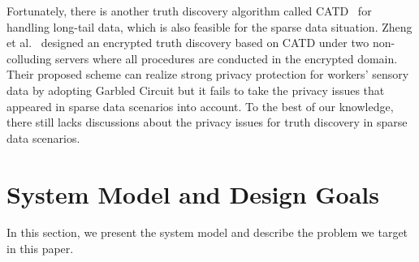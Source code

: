 \documentclass[conference]{IEEEtran}
\begin{document}
Fortunately, there is another truth discovery algorithm called CATD~\cite{li_confidence-aware_2014} for handling long-tail data, which is also feasible for the sparse data situation.
Zheng et al.~\cite{zheng_learning_2018} designed an encrypted truth discovery based on CATD under two non-colluding servers where all procedures are conducted in the encrypted domain.
Their proposed scheme can realize strong privacy protection for workers' sensory data by adopting Garbled Circuit but it fails to take the privacy issues that appeared in sparse data scenarios into account.
To the best of our knowledge, there still lacks discussions about the privacy issues for truth discovery in sparse data scenarios.

\section{System Model and Design Goals}\label{sec3}
In this section, we present the system model and describe the problem we target in this paper.
\end{document}
